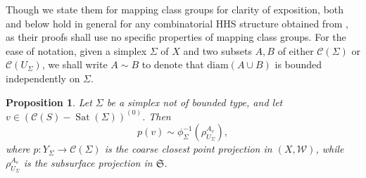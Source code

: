 \documentclass[svgnames]{amsart}
\theoremstyle{plain}
\newtheorem{prop}[thm]{Proposition}
\theoremstyle{definition}
\newcommand{\frakS}{\mathfrak S}
\newcommand{\C}[1]{\mathcal{C}(#1)}
\newcommand{\diam}{\mathrm{diam}}
\newcommand{\W}{\mathcal{W}}
\newcommand{\Sat}{\operatorname{Sat}}
\begin{document}
Though we state them for mapping class groups for clarity of exposition, both  and  below hold in general for any combinatorial HHS structure obtained from \cite[Theorem 3.15]{converse}, as their proofs shall use no specific properties of mapping class groups. For the ease of notation, given a simplex $\Sigma$ of $X$ and two subsets $A,B$ of either $ \C{\Sigma}$ or $\C{U_\Sigma}$, we shall write $A\sim B$ to denote that $\diam(A\cup B)$ is bounded independently on $\Sigma$.
    \begin{prop}\label{prop:different_proj_in_converse_are_equal} Let $\Sigma$ be a simplex not of bounded type, and let $v\in (\C S-\Sat(\Sigma))^{(0)}$. Then
    $$p(v)\sim  \phi_\Sigma^{-1}\left(\rho^{A_v}_{U_\Sigma}\right),$$
    where $p\colon Y_\Sigma\to \C{\Sigma}$ is the coarse closest point projection in $(X,\W)$, while $\rho^{A_v}_{U_\Sigma}$ is the subsurface projection in $\frakS$.
    \end{prop}
\end{document}
